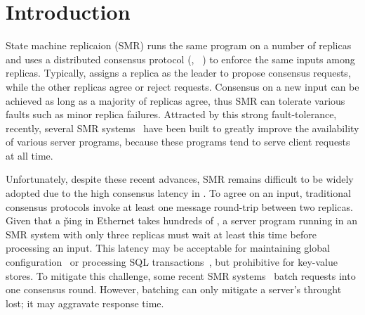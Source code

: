 \section{Introduction} \label{sec:intro}

State machine replicaion (SMR) runs the same program on a 
number of replicas and uses a distributed consensus protocol (\eg, 
\paxos~\cite{crane:sosp15}) to enforce the same inputs among 
replicas. Typically, \paxos assigns a replica as the leader to propose 
consensus requests, while the other replicas agree or reject requests. 
Consensus on a new input can be achieved as long as a majority of replicas 
agree, thus SMR can tolerate various faults such as minor replica 
failures. Attracted by this strong fault-tolerance, recently, several SMR 
systems~\cite{chubby:osdi, zookeeper, crane:sosp15, eve:osdi12, rex:eurosys14} 
have been built to greatly improve the availability of various server programs, 
because these programs tend to serve client requests at all time.

Unfortunately, despite these recent advances, SMR remains difficult to be 
widely adopted due to the high consensus latency in \paxos. To agree on an 
input, traditional consensus protocols invoke at least one message round-trip 
between two replicas. Given that a \v{ping} in Ethernet takes hundreds of \us, a 
server program running in an SMR system with only three replicas must wait at 
least this time before processing an input. This latency may be acceptable for 
maintaining global configuration~\cite{chubby:osdi,zookeeper} or processing SQL 
transactions~\cite{crane:sosp15,eve:osdi12}, but prohibitive for 
key-value stores. To mitigate this challenge, some recent SMR 
systems~\cite{calvin:sigmod12,rex:eurosys14} batch requests into one 
consensus round. However, batching can only mitigate a server's throught lost; 
it may aggravate response time. 


